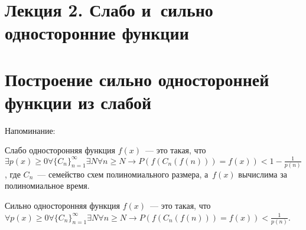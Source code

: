 \documentclass{article}
\begin{document}
\section*{Лекция 2. Слабо и~сильно односторонние функции}
\resetcntrs

\section{Построение сильно односторонней функции из слабой}

Напоминание:

\begin{definition}
	Слабо односторонняя функция $f(x)$~--- это такая, что $\exists p(x) \ge 0
	\forall \{C_n\}_{n=1}^{\infty} \exists N \forall n \ge N \rightarrow
	P(f(C_n(f(n))) = f(x)) < 1 - \frac{1}{p(n)}$, где $C_n$~--- семейство схем
	полиномиального размера, а~$f(x)$ вычислима за полиномиальное время.
\end{definition}
\begin{definition}
	Сильно односторонняя функция $f(x)$~--- это такая, что $\forall p(x) \ge 0
	\forall \{C_n\}_{n=1}^{\infty} \exists N \forall n \ge N \rightarrow
	P(f(C_n(f(n))) = f(x)) < \frac{1}{p(n)}$.
\end{definition}
\end{document}
